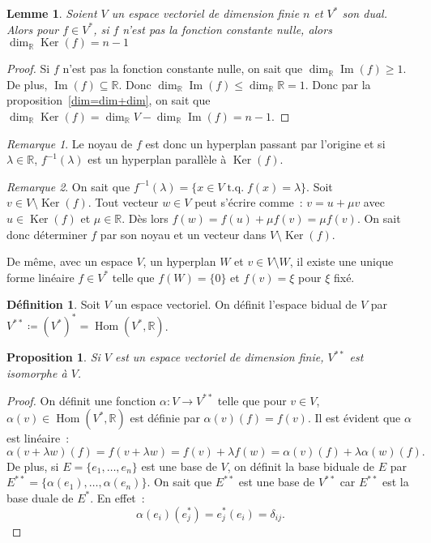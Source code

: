 \documentclass{article}
\DeclareMathOperator{\tq}{\text{ t.q. }}
\DeclareMathOperator{\Ker}{Ker}
\DeclareMathOperator{\Imf}{Im}
\DeclareMathOperator{\Hom}{Hom}
\newcommand{\R}{\mathbb R}
\newtheorem{prp}[thm]{Proposition}
\newtheorem{lem}[thm]{Lemme}
\theoremstyle{definition}
\newtheorem{déf}[thm]{Définition}
\theoremstyle{remark}
\newtheorem*{rmq}{Remarque}
\begin{document}
		\begin{lem} Soient $V$ un espace vectoriel de dimension finie $n$ et $V^*$ son dual. Alors pour $f \in V^*$, si $f$ n'est pas la fonction constante nulle,
		alors $\dim_\R \Ker(f) = n-1$ \end{lem}

		\begin{proof} Si $f$ n'est pas la fonction constante nulle, on sait que $\dim_\R \Imf(f) \geq 1$. De plus, $\Imf(f) \subseteq \R$. Donc
		$\dim_\R\Imf(f) \leq \dim_\R \R = 1$. Donc par la proposition~\ref{dim=dim+dim}, on sait que $\dim_\R\Ker(f) = \dim_\R V - \dim_\R\Imf(f) = n-1$. \end{proof}

		\begin{rmq} Le noyau de $f$ est donc un hyperplan passant par l'origine et si $\lambda \in \R$, $f^{-1}(\lambda)$ est un hyperplan parallèle à $\Ker(f)$. \end{rmq}

		\begin{rmq} On sait que $f^{-1}(\lambda) = \{x \in V \tq f(x) = \lambda\}$. Soit $v \in V \setminus \Ker(f)$. Tout vecteur $w \in V$ peut s'écrire comme~:
		$v = u + \mu v$ avec $u \in \Ker(f)$ et $\mu \in \R$. Dès lors $f(w) = f(u) + \mu f(v) = \mu f(v)$. On sait donc déterminer $f$ par son noyau et un vecteur dans
		$V \setminus \Ker(f)$. 
		
		De même, avec un espace $V$, un hyperplan $W$ et $v \in V \setminus W$, il existe une unique forme linéaire $f \in V^*$ telle que $f(W) = \{0\}$ et $f(v) = \xi$
		pour $\xi$ fixé. \end{rmq}

		\begin{déf} Soit $V$ un espace vectoriel. On définit l'espace bidual de $V$ par $V^{**} \coloneqq (V^*)^* = \Hom(V^*, \R)$. \end{déf}
		
		\begin{prp} Si $V$ est un espace vectoriel de dimension finie, $V^{**}$ est isomorphe à $V$. \end{prp}
		
		\begin{proof} On définit une fonction $\alpha : V \to V^{**}$ telle que pour $v \in V$, $\alpha(v) \in \Hom(V^*, \R)$ est définie par $\alpha(v)(f) = f(v)$.
		Il est évident que $\alpha$ est linéaire~: \[\alpha(v+\lambda w)(f) = f(v+\lambda w) = f(v)+\lambda f(w) = \alpha(v)(f) + \lambda\alpha(w)(f).\]
		De plus, si $E = \{e_1, \dotsc, e_n\}$ est une base de $V$, on définit la base biduale de $E$ par $E^{**} = \{\alpha(e_1), \dotsc, \alpha(e_n)\}$.
		On sait que $E^{**}$ est une base de $V^{**}$ car $E^{**}$ est la base duale de $E^*$. En effet~: \[\alpha(e_i)(e_j^*) = e_j^*(e_i) = \delta_{ij}.\] \end{proof}
\end{document}
